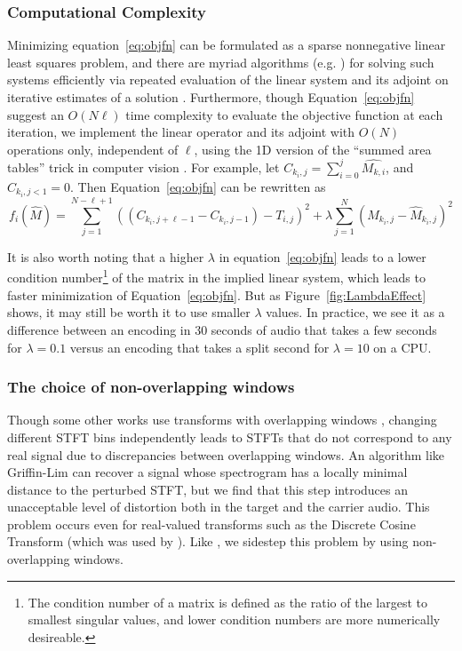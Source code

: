 \documentclass[runningheads]{llncs}
\begin{document}
\subsubsection{Computational Complexity}
\label{sec:computation}
Minimizing equation~\ref{eq:objfn} can be formulated as a sparse nonnegative linear least squares problem, and there are myriad algorithms (e.g. \cite{branch1999subspace}) for solving such systems efficiently via repeated evaluation of the linear system and its adjoint on iterative estimates of a solution .  Furthermore, though Equation~\ref{eq:objfn} suggest an $O(N \ell)$ time complexity to evaluate the objective function at each iteration, we implement the linear operator and its adjoint with $O(N)$ operations only, independent of $\ell$, using the 1D version of the ``summed area tables'' trick in computer vision \cite{lewisfast}.  For example, let $C_{k_i, j} = \sum_{i=0}^{j} \hat{M_{k, i}}$, and $C_{k_i, j < 1} = 0$.  Then Equation~\ref{eq:objfn} can be rewritten as 
\begin{equation}
  \label{eq:objfncumusum}
  f_i(\hat{M}) = \sum_{j=1}^{N-\ell+1} \left( (C_{k_i, j+\ell-1}-C_{k_i, j-1}) - T_{i, j} \right)^2 + \lambda \sum_{j=1}^N \left( M_{k_i, j} - \hat{M}_{k_i, j} \right)^2
\end{equation}


It is also worth noting that a higher $\lambda$ in equation~\ref{eq:objfn} leads to a lower condition number\footnote{The condition number of a matrix is defined as the ratio of the largest to smallest singular values, and lower condition numbers are more numerically desireable.} of the matrix in the implied linear system, which leads to faster minimization of Equation~\ref{eq:objfn}.  But as Figure~\ref{fig:LambdaEffect} shows, it may still be worth it to use smaller $\lambda$ values.  In practice, we see it as a difference between an encoding in 30 seconds of audio that takes a few seconds for $\lambda=0.1$ versus an encoding that takes a split second for $\lambda=10$ on a CPU.



\subsubsection{The choice of non-overlapping windows}
Though some other works use transforms with overlapping windows \cite{yun2009acoustic,geleta_pixinwav_2021}, changing different STFT bins independently leads to STFTs that do not correspond to any real signal due to discrepancies between overlapping windows.  An algorithm like Griffin-Lim \cite{griffin1984signal} can recover a signal whose spectrogram has a locally minimal distance to the perturbed STFT, but we find that this step introduces an unacceptable level of distortion both in the target and the carrier audio.  This problem occurs even for real-valued transforms such as the Discrete Cosine Transform (which was used by \cite{geleta_pixinwav_2021}).  Like \cite{xiaoxiao_dong_data_2004}, we sidestep this problem by using non-overlapping windows.  
\end{document}
